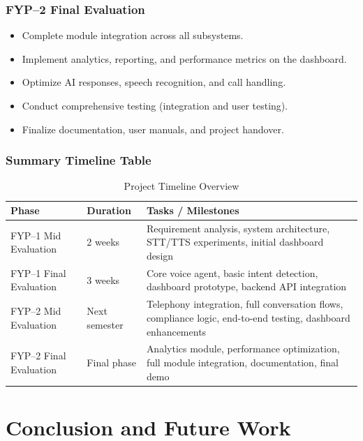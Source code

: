 \documentclass[12pt,a4paper]{report}
\begin{document}
\subsection{FYP–2 Final Evaluation}
\begin{itemize}
    \item Complete module integration across all subsystems.
    \item Implement analytics, reporting, and performance metrics on the dashboard.
    \item Optimize AI responses, speech recognition, and call handling.
    \item Conduct comprehensive testing (integration and user testing).
    \item Finalize documentation, user manuals, and project handover.
\end{itemize}

\subsection{Summary Timeline Table}

\begin{center}
\begin{table}[H]
\centering
\caption{Project Timeline Overview}
\begin{tabular}{|l|l|p{8cm}|}
\hline
\textbf{Phase} & \textbf{Duration} & \textbf{Tasks / Milestones} \\ \hline
FYP–1 Mid Evaluation & 2 weeks & Requirement analysis, system architecture, STT/TTS experiments, initial dashboard design \\ \hline
FYP–1 Final Evaluation & 3 weeks & Core voice agent, basic intent detection, dashboard prototype, backend API integration \\ \hline
FYP–2 Mid Evaluation & Next semester & Telephony integration, full conversation flows, compliance logic, end-to-end testing, dashboard enhancements \\ \hline
FYP–2 Final Evaluation & Final phase & Analytics module, performance optimization, full module integration, documentation, final demo \\ \hline
\end{tabular}
\end{table}

\end{center}

\chapter{Conclusion and Future Work}
\end{document}
